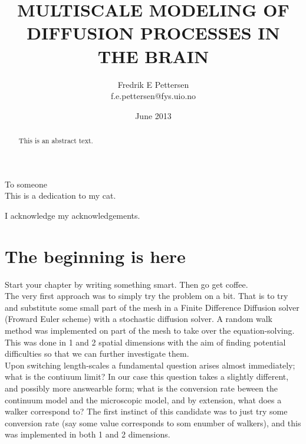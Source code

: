 \documentclass[twoside,english]{uiofysmaster}
\author{Fredrik E Pettersen\\ f.e.pettersen@fys.uio.no}
\title{\uppercase{Multiscale modeling of diffusion processes in the brain}}
\date{June 2013}
\begin{document}
%

\maketitle

\begin{abstract}
This is an abstract text.
\end{abstract}

\begin{dedication}
  To someone
  \\\vspace{12pt}
  This is a dedication to my cat.
\end{dedication}

\begin{acknowledgements}
  I acknowledge my acknowledgements.
\end{acknowledgements}

\tableofcontents
\clearpage
\listoffigures
\clearpage
\listoftables

\chapter{The beginning is here}

Start your chapter by writing something smart. Then go get coffee.\\
The very first approach was to simply try the problem on a bit. That is to try and substitute some small part of the mesh in a Finite Difference Diffusion solver (Froward Euler scheme) with a stochastic diffusion solver. A random walk method was implemented on part of the mesh to take over the equation-solving. This was done in 1 and 2 spatial dimensions with the aim of finding potential difficulties so that we can further investigate them. \\
Upon switching length-scales a fundamental question arises almost immediately; what is the contiuum limit? In our case this question takes a slightly different, and possibly more answearble form; what is the conversion rate beween the continuum model and the microscopic model, and by extension, what does a walker correspond to?
The first instinct of this candidate was to just try some conversion rate (say some value corresponds to som enumber of walkers), and this was implemented in both 1 and 2 dimensions.
\end{document}
